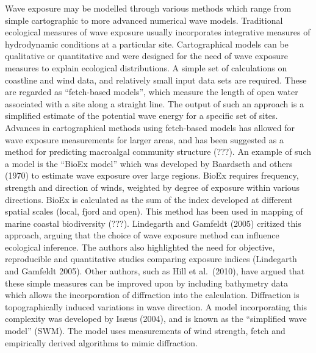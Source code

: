 \documentclass[]{article}
\begin{document}
Wave exposure may be modelled through various methods which range from
simple cartographic to more advanced numerical wave models. Traditional
ecological measures of wave exposure usually incorporates integrative
measures of hydrodynamic conditions at a particular site. Cartographical
models can be qualitative or quantitative and were designed for the need
of wave exposure measures to explain ecological distributions. A simple
set of calculations on coastline and wind data, and relatively small
input data sets are required. These are regarded as ``fetch-based
models'', which measure the length of open water associated with a site
along a straight line. The output of such an approach is a simplified
estimate of the potential wave energy for a specific set of sites.
Advances in cartographical methods using fetch-based models has allowed
for wave exposure measurements for larger areas, and has been suggested
as a method for predicting macroalgal community structure (???). An
example of such a model is the ``BioEx model'' which was developed by
Baardseth and others (1970) to estimate wave exposure over large
regions. BioEx requires frequency, strength and direction of winds,
weighted by degree of exposure within various directions. BioEx is
calculated as the sum of the index developed at different spatial scales
(local, fjord and open). This method has been used in mapping of marine
coastal biodiversity (???). Lindegarth and Gamfeldt (2005) critized this
approach, arguing that the choice of wave exposure method can influence
ecological inference. The authors also highlighted the need for
objective, reproducible and quantitative studies comparing exposure
indices (Lindegarth and Gamfeldt 2005). Other authors, such as Hill et
al.~(2010), have argued that these simple measures can be improved upon
by including bathymetry data which allows the incorporation of
diffraction into the calculation. Diffraction is topographically induced
variations in wave direction. A model incorporating this complexity was
developed by Isæus (2004), and is known as the ``simplified wave model''
(SWM). The model uses measurements of wind strength, fetch and
empirically derived algorithms to mimic diffraction.
\end{document}
